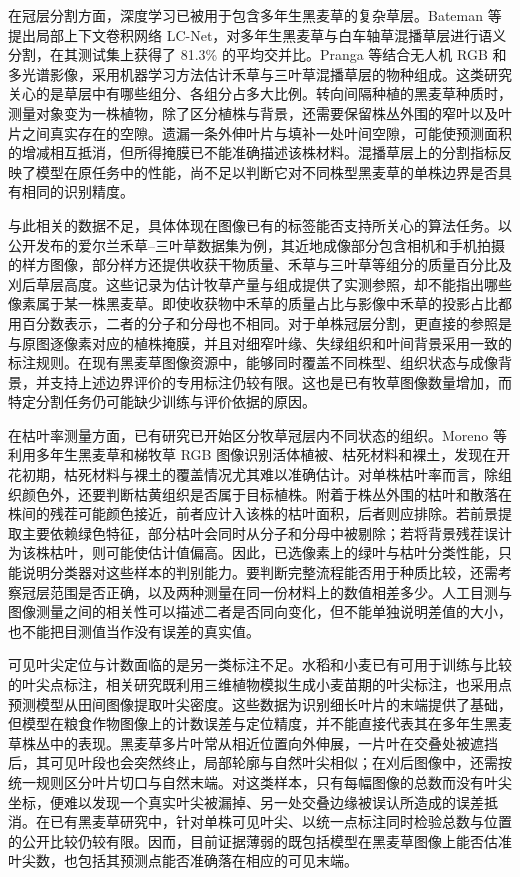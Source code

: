 在冠层分割方面，深度学习已被用于包含多年生黑麦草的复杂草层。Bateman 等提出局部上下文卷积网络 LC-Net，对多年生黑麦草与白车轴草混播草层进行语义分割，在其测试集上获得了 81.3\% 的平均交并比。Pranga 等结合无人机 RGB 和多光谱影像，采用机器学习方法估计禾草与三叶草混播草层的物种组成。这类研究关心的是草层中有哪些组分、各组分占多大比例。转向间隔种植的黑麦草种质时，测量对象变为一株植物，除了区分植株与背景，还需要保留株丛外围的窄叶以及叶片之间真实存在的空隙。遗漏一条外伸叶片与填补一处叶间空隙，可能使预测面积的增减相互抵消，但所得掩膜已不能准确描述该株材料。混播草层上的分割指标反映了模型在原任务中的性能，尚不足以判断它对不同株型黑麦草的单株边界是否具有相同的识别精度。

与此相关的数据不足，具体体现在图像已有的标签能否支持所关心的算法任务。以公开发布的爱尔兰禾草--三叶草数据集为例，其近地成像部分包含相机和手机拍摄的样方图像，部分样方还提供收获干物质量、禾草与三叶草等组分的质量百分比及刈后草层高度。这些记录为估计牧草产量与组成提供了实测参照，却不能指出哪些像素属于某一株黑麦草。即使收获物中禾草的质量占比与影像中禾草的投影占比都用百分数表示，二者的分子和分母也不相同。对于单株冠层分割，更直接的参照是与原图逐像素对应的植株掩膜，并且对细窄叶缘、失绿组织和叶间背景采用一致的标注规则。在现有黑麦草图像资源中，能够同时覆盖不同株型、组织状态与成像背景，并支持上述边界评价的专用标注仍较有限。这也是已有牧草图像数量增加，而特定分割任务仍可能缺少训练与评价依据的原因。

在枯叶率测量方面，已有研究已开始区分牧草冠层内不同状态的组织。Moreno 等利用多年生黑麦草和梯牧草 RGB 图像识别活体植被、枯死材料和裸土，发现在开花初期，枯死材料与裸土的覆盖情况尤其难以准确估计。对单株枯叶率而言，除组织颜色外，还要判断枯黄组织是否属于目标植株。附着于株丛外围的枯叶和散落在株间的残茬可能颜色接近，前者应计入该株的枯叶面积，后者则应排除。若前景提取主要依赖绿色特征，部分枯叶会同时从分子和分母中被剔除；若将背景残茬误计为该株枯叶，则可能使估计值偏高。因此，已选像素上的绿叶与枯叶分类性能，只能说明分类器对这些样本的判别能力。要判断完整流程能否用于种质比较，还需考察冠层范围是否正确，以及两种测量在同一份材料上的数值相差多少。人工目测与图像测量之间的相关性可以描述二者是否同向变化，但不能单独说明差值的大小，也不能把目测值当作没有误差的真实值。

可见叶尖定位与计数面临的是另一类标注不足。水稻和小麦已有可用于训练与比较的叶尖点标注，相关研究既利用三维植物模拟生成小麦苗期的叶尖标注，也采用点预测模型从田间图像提取叶尖密度。这些数据为识别细长叶片的末端提供了基础，但模型在粮食作物图像上的计数误差与定位精度，并不能直接代表其在多年生黑麦草株丛中的表现。黑麦草多片叶常从相近位置向外伸展，一片叶在交叠处被遮挡后，其可见叶段也会突然终止，局部轮廓与自然叶尖相似；在刈后图像中，还需按统一规则区分叶片切口与自然末端。对这类样本，只有每幅图像的总数而没有叶尖坐标，便难以发现一个真实叶尖被漏掉、另一处交叠边缘被误认所造成的误差抵消。在已有黑麦草研究中，针对单株可见叶尖、以统一点标注同时检验总数与位置的公开比较仍较有限。因而，目前证据薄弱的既包括模型在黑麦草图像上能否估准叶尖数，也包括其预测点能否准确落在相应的可见末端。

